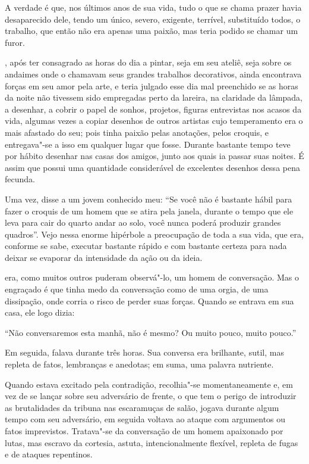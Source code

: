 A verdade é que, nos últimos anos de sua vida, tudo o que se chama
prazer havia desaparecido dele, tendo um único, severo, exigente,
terrível, substituído todos, o trabalho, que então não era apenas uma
paixão, mas teria podido se chamar um furor.

, após ter consagrado as horas do dia a pintar, seja em seu
ateliê, seja sobre os andaimes onde o chamavam seus grandes trabalhos
decorativos, ainda encontrava forças em seu amor pela arte, e teria
julgado esse dia mal preenchido se as horas da noite não tivessem sido
empregadas perto da lareira, na claridade da lâmpada, a desenhar, a
cobrir o papel de sonhos, projetos, figuras entrevistas nos acasos da
vida, algumas vezes a copiar desenhos de outros artistas cujo
temperamento era o mais afastado do seu; pois tinha paixão pelas
anotações, pelos croquis, e entregava"-se a isso em qualquer lugar que
fosse. Durante bastante tempo teve por hábito desenhar nas casas dos
amigos, junto aos quais ia passar suas noites. É assim que 
possui uma quantidade considerável de excelentes desenhos dessa pena
fecunda.

Uma vez, disse a um jovem conhecido meu: ``Se você não é
bastante hábil para fazer o croquis de um homem que se atira pela
janela, durante o tempo que ele leva para cair do quarto andar ao solo,
você nunca poderá produzir grandes quadros''. Vejo nessa
enorme hipérbole a preocupação de toda a sua vida, que era, conforme se
sabe, executar bastante rápido e com bastante certeza para nada deixar
se evaporar da intensidade da ação ou da ideia.

 era, como muitos outros puderam observá"-lo, um homem de
conversação. Mas o engraçado é que tinha medo da conversação como de
uma orgia, de uma dissipação, onde corria o risco de perder suas
forças. Quando se entrava em sua casa, ele logo dizia:

``Não conversaremos esta manhã, não é mesmo? Ou muito
pouco, muito pouco.''

Em seguida, falava durante três horas. Sua conversa era brilhante,
sutil, mas repleta de fatos, lembranças e anedotas; em suma, uma
palavra nutriente.

Quando estava excitado pela contradição, recolhia"-se momentaneamente e,
em vez de se lançar sobre seu adversário de frente, o que tem o perigo
de introduzir as brutalidades da tribuna nas escaramuças de salão,
jogava durante algum tempo com seu adversário, em seguida voltava ao
ataque com argumentos ou fatos imprevistos. Tratava"-se da conversação
de um homem apaixonado por lutas, mas escravo da cortesia, astuta,
intencionalmente flexível, repleta de fugas e de ataques repentinos.

